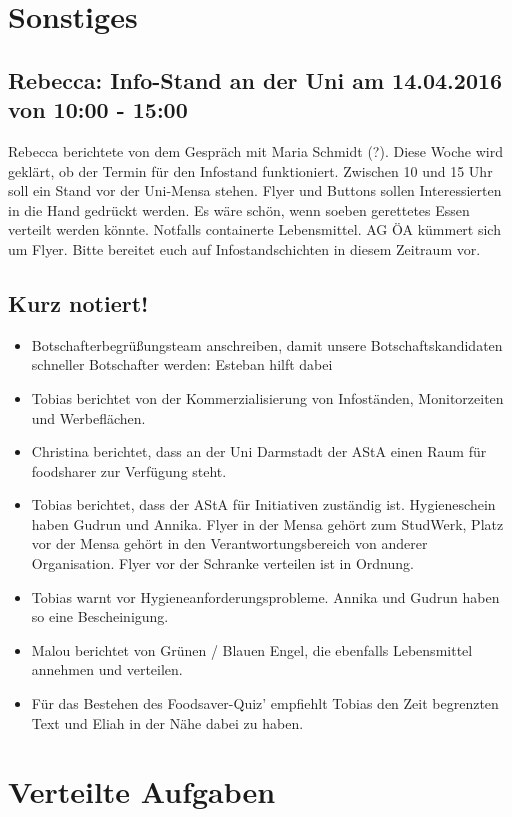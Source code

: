 \documentclass{scrreprt}
\begin{document}
\chapter{Sonstiges}
\section{Rebecca: Info-Stand an der Uni am 14.04.2016 von 10:00 - 15:00}
	Rebecca berichtete von dem Gespräch mit Maria Schmidt (?). Diese Woche wird geklärt, ob der Termin für den Infostand funktioniert. Zwischen 10 und 15 Uhr soll ein Stand vor der Uni-Mensa stehen. Flyer und Buttons sollen Interessierten in die Hand gedrückt werden. Es wäre schön, wenn soeben gerettetes Essen verteilt werden könnte. Notfalls containerte Lebensmittel. AG ÖA kümmert sich um Flyer. Bitte bereitet euch auf Infostandschichten in diesem Zeitraum vor. 
\section{Kurz notiert!}
	\begin{itemize}
		\item Botschafterbegrüßungsteam anschreiben, damit unsere Botschaftskandidaten schneller Botschafter werden: Esteban hilft dabei
		\item Tobias berichtet von der Kommerzialisierung von Infoständen, Monitorzeiten und Werbeflächen. 
		\item Christina berichtet, dass an der Uni Darmstadt der AStA einen Raum für foodsharer zur Verfügung steht. 
		\item Tobias berichtet, dass der AStA für Initiativen zuständig ist. Hygieneschein haben Gudrun und Annika. Flyer in der Mensa gehört zum StudWerk, Platz vor der Mensa gehört in den Verantwortungsbereich von anderer Organisation. Flyer vor der Schranke verteilen ist in Ordnung.
		\item Tobias warnt vor Hygieneanforderungsprobleme. Annika und Gudrun haben so eine Bescheinigung.
		\item Malou berichtet von Grünen / Blauen Engel, die ebenfalls Lebensmittel annehmen und verteilen.	
		\item Für das Bestehen des Foodsaver-Quiz' empfiehlt Tobias den Zeit begrenzten Text und Eliah in der Nähe dabei zu haben.	
	\end{itemize}
 
\chapter{Verteilte Aufgaben}
\end{document}
